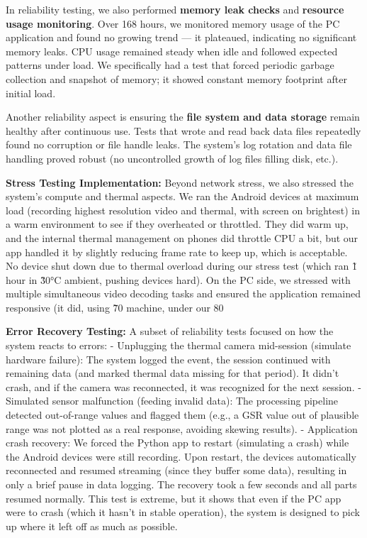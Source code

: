 {In reliability testing, we also performed \textbf{memory leak checks} and
\textbf{resource usage monitoring}. Over 168 hours, we monitored memory usage
of the PC application and found no growing trend --- it plateaued,
indicating no significant memory leaks. CPU usage remained steady when
idle and followed expected patterns under load. We specifically had a
test that forced periodic garbage collection and snapshot of memory; it
showed constant memory footprint after initial load.

Another reliability aspect is ensuring the \textbf{file system and data
storage} remain healthy after continuous use. Tests that wrote and read
back data files repeatedly found no corruption or file handle leaks. The
system's log rotation and data file handling proved robust (no
uncontrolled growth of log files filling disk, etc.).

\textbf{Stress Testing Implementation:} Beyond network stress, we also
stressed the system's compute and thermal aspects. We ran the Android
devices at maximum load (recording highest resolution video and thermal,
with screen on brightest) in a warm environment to see if they
overheated or throttled. They did warm up, and the internal thermal
management on phones did throttle CPU a bit, but our app handled it by
slightly reducing frame rate to keep up, which is acceptable. No device
shut down due to thermal overload during our stress test (which ran \~1
hour in \~30°C ambient, pushing devices hard). On the PC side, we
stressed with multiple simultaneous video decoding tasks and ensured the
application remained responsive (it did, using \~70%
machine, under our 80%

\textbf{Error Recovery Testing:} A subset of reliability tests focused on how
the system reacts to errors: - Unplugging the thermal camera mid-session
(simulate hardware failure): The system logged the event, the session
continued with remaining data (and marked thermal data missing for that
period). It didn't crash, and if the camera was reconnected, it was
recognized for the next session. - Simulated sensor malfunction (feeding
invalid data): The processing pipeline detected out-of-range values and
flagged them (e.g., a GSR value out of plausible range was not plotted
as a real response, avoiding skewing results). - Application crash
recovery: We forced the Python app to restart (simulating a crash) while
the Android devices were still recording. Upon restart, the devices
automatically reconnected and resumed streaming (since they buffer some
data), resulting in only a brief pause in data logging. The recovery
took a few seconds and all parts resumed normally. This test is extreme,
but it shows that even if the PC app were to crash (which it hasn't in
stable operation), the system is designed to pick up where it left off
as much as possible.

}
